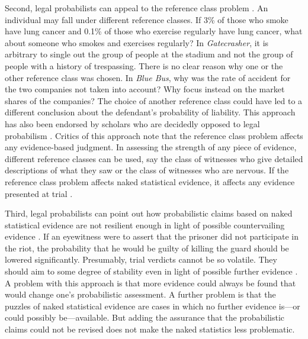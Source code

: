 \documentclass{article}
\begin{document}
Second, legal probabilists can appeal to the reference class problem \citep{colyvan2001crime}.
An individual may fall under different reference classes. If 3\% of those who smoke have lung cancer and 0.1\% of those who exercise regularly have lung cancer, what  about someone who smokes and exercises regularly? In \textit{Gatecrasher}, it is arbitrary to  single out the group of people at the stadium and not the group of people with a history of trespassing. There is no clear reason why one or the other reference class was chosen. In \textit{Blue Bus}, why was the rate of accident for the two companies not taken into account? Why focus instead on the market shares of the companies? The choice of another reference class could have led to a different conclusion about the defendant's probability of liability.
This approach has also been endorsed by 
scholars who are decidedly opposed to legal probabilism \citep{allen2007problematic}.
Critics of this approach note that the reference class problem affects any evidence-based judgment. In assessing the strength of any piece of evidence, different reference classes can be used, say the class of witnesses who give detailed descriptions of what they saw or the class of witnesses who are nervous. If the reference class problem affects naked statistical evidence, it affects any evidence presented at trial \citep{redmayne2008exploring}. 

 
 Third, legal probabilists can point out how probabilistic claims based on naked statistical evidence are not resilient enough in light of possible countervailing evidence \citep[on the notion of resilience and stability of belief, see][]{Skyrms1980, leitgeb2014}. 
  If an eyewitness were to assert that the prisoner did not participate in the riot, the probability that he would be guilty of killing the guard should be lowered significantly. Presumably, trial verdicts cannot be so volatile. They should aim to some degree of stability even in light of possible further evidence \citep{bolinger2020}.  
A problem with this approach is that more evidence could always be found that would change one's probabilistic assessment.
A further problem is that the puzzles of naked statistical evidence are cases in which no further evidence is---or could possibly be---available. But adding the assurance that the probabilistic claims could not be revised does not make the naked statistics less problematic. 
 
 
\end{document}
